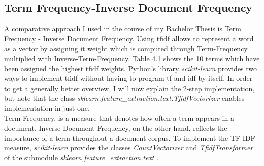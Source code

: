 \documentclass[a4paper, 11pt,titlepage,oneside,openany]{book}
\begin{document}
\subsection{Term Frequency-Inverse Document Frequency}
A comparative approach I used in the course of my Bachelor Thesis is Term Frequency - Inverse Document Frequency. Using \gls{tfidf} allows to represent a word as a vector by assigning it weight which is computed through Term-Frequency multiplied with Inverse-Term-Frequency. Table 4.1 shows the 10 terms which have been assigned the highest \gls{tfidf} weights. 
\newpage
Python's library \textit{scikit-learn} \cite{scikit-learn} provides two ways to implement \gls{tfidf} without having to program \gls{tf} and \gls{idf} by itself.
In order to get a generally better overview, I will now explain the 2-step implementation, but note that the class \textit{sklearn.feature\_extraction.text.TfidfVectorizer} enables implementation in just one. \\
\indent Term-Frequency, is a measure that denotes how often a term appears in a document. Inverse Document Frequency, on the other hand, reflects the importance of a term throughout a document corpus. To implement the TF-IDF measure, \textit{scikit-learn} provides the classes \textit{CountVectorizer} and \textit{TfidfTransformer} of the submodule \textit{sklearn.feature\_extraction.text} \cite{tfidf}.
\end{document}
